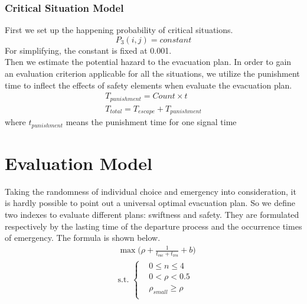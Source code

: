 \documentclass{mcmthesis}
\begin{document}
\subsubsection{Critical Situation Model}
\noindent First we set up the happening probability of critical situations.
\[
	P_3(i,j)=constant
\]
\indent For simplifying, the constant is fixed at 0.001.\\
\indent Then we estimate the potential hazard to the evacuation plan. In order to gain an evaluation criterion  applicable for all the situations, we utilize the punishment time to inflect the effects of safety elements when evaluate the evacuation plan.
\[
	\begin{matrix}
		T_{punishment}=Count \times t   \\
		T_{total}=T_{escape}+T_{punishment}
	\end{matrix}
\]
\indent where \(t_{punishment}\) means the punishment time for one signal time
\section{Evaluation Model}
\noindent Taking the randomness of individual choice and emergency into consideration, it is hardly possible to point out a universal optimal evacuation plan. So we  define two indexes to evaluate different plans: swiftness and safety. They are formulated respectively by the lasting time of the departure process and the occurrence times of emergency. The formula is shown below.
\begin{align}
	&\max\Big(\rho+\frac{1}{t_\textrm{esc}+t_\textrm{res}}+b\Big)\\
	&\textrm{s.t. }
	\left\{
		\begin{aligned}
			&0\leqslant n\leq 4 \\
			&0<\rho < 0.5 \\
			&\rho_{small}\geqslant \rho \\
		\end{aligned}
	\right.
\end{align}
\end{document}
